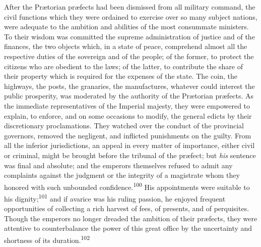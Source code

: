 
After the Prætorian præfects had been dismissed from all military
command, the civil functions which they were ordained to exercise
over so many subject nations, were adequate to the ambition and
abilities of the most consummate ministers. To their wisdom was
committed the supreme administration of justice and of the
finances, the two objects which, in a state of peace, comprehend
almost all the respective duties of the sovereign and of the
people; of the former, to protect the citizens who are obedient
to the laws; of the latter, to contribute the share of their
property which is required for the expenses of the state. The
coin, the highways, the posts, the granaries, the manufactures,
whatever could interest the public prosperity, was moderated by
the authority of the Prætorian præfects. As the immediate
representatives of the Imperial majesty, they were empowered to
explain, to enforce, and on some occasions to modify, the general
edicts by their discretionary proclamations. They watched over
the conduct of the provincial governors, removed the negligent,
and inflicted punishments on the guilty. From all the inferior
jurisdictions, an appeal in every matter of importance, either
civil or criminal, might be brought before the tribunal of the
præfect; but \textit{his} sentence was final and absolute; and the
emperors themselves refused to admit any complaints against the
judgment or the integrity of a magistrate whom they honored with
such unbounded confidence.\textsuperscript{100} His appointments were suitable to
his dignity;\textsuperscript{101} and if avarice was his ruling passion, he
enjoyed frequent opportunities of collecting a rich harvest of
fees, of presents, and of perquisites. Though the emperors no
longer dreaded the ambition of their præfects, they were
attentive to counterbalance the power of this great office by the
uncertainty and shortness of its duration.\textsuperscript{102}


